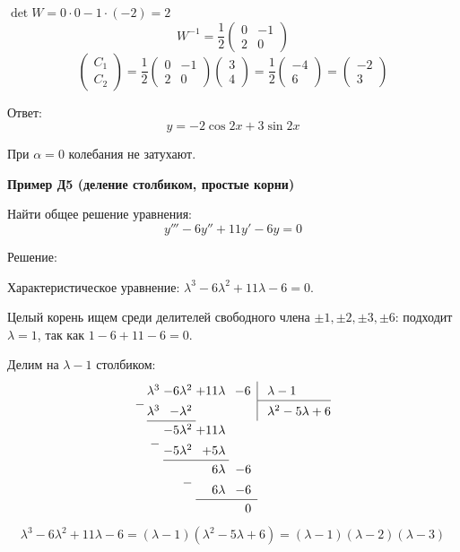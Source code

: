 \documentclass[11pt,a4paper]{article}
\newcommand{\example}[1]{\par\medskip\noindent\textbf{#1}\par\nopagebreak\smallskip}
\newcommand{\sub}{\raisebox{1.4ex}{$-$}}
\newcommand{\nb}[1]{\multicolumn{1}{r}{#1}}
\begin{document}
$\det W = 0 \cdot 0 - 1 \cdot (-2) = 2$
\[
  W^{-1} = \frac12 \begin{pmatrix} 0 & -1 \\ 2 & 0 \end{pmatrix}
\]
\[
  \begin{pmatrix} C_1 \\ C_2 \end{pmatrix}
  = \frac12 \begin{pmatrix} 0 & -1 \\ 2 & 0 \end{pmatrix} \begin{pmatrix} 3 \\ 4 \end{pmatrix}
  = \frac12 \begin{pmatrix} -4 \\ 6 \end{pmatrix}
  = \begin{pmatrix} -2 \\ 3 \end{pmatrix}
\]

Ответ:
\[
  y = -2\cos 2x + 3\sin 2x
\]

При $\alpha = 0$ колебания не затухают.

\example{Пример Д5 (деление столбиком, простые корни)}

Найти общее решение уравнения:
\[
  y''' - 6y'' + 11y' - 6y = 0
\]

Решение:

Характеристическое уравнение: $\lambda^3 - 6\lambda^2 + 11\lambda - 6 = 0$.

Целый корень ищем среди делителей свободного члена $\pm1, \pm2, \pm3, \pm6$: подходит $\lambda = 1$, так как $1 - 6 + 11 - 6 = 0$.

Делим на $\lambda - 1$ столбиком:
\[
\renewcommand{\arraystretch}{1.25}
\begin{array}{@{}c@{\,}r@{\;}r@{\;}r@{\;}r|l@{}}
       & \lambda^3 & -6\lambda^2 & +11\lambda & -6 & \;\lambda - 1\\ \cline{6-6}
  \sub & \lambda^3 & -\lambda^2  &            & \  & \;\lambda^2 - 5\lambda + 6\\ \cline{2-3}
       &           & -5\lambda^2 & +11\lambda & \nb{}\\
       &      \sub & -5\lambda^2 & +5\lambda  & \nb{}\\ \cline{3-4}
       &           &             & 6\lambda   & \nb{-6}\\
       &           &        \sub & 6\lambda   & \nb{-6}\\ \cline{4-5}
       &           &             &            & \nb{0}
\end{array}
\]
\[
  \lambda^3 - 6\lambda^2 + 11\lambda - 6 = (\lambda - 1)(\lambda^2 - 5\lambda + 6) = (\lambda - 1)(\lambda - 2)(\lambda - 3)
\]
\end{document}

